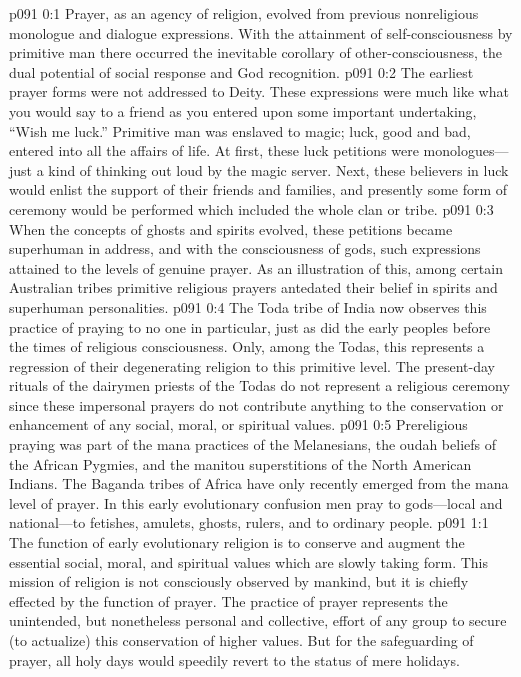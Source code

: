 \author{Chief of Midwayers}
\vs p091 0:1 Prayer, as an agency of religion, evolved from previous nonreligious monologue and dialogue expressions. With the attainment of self\hyp{}consciousness by primitive man there occurred the inevitable corollary of other\hyp{}consciousness, the dual potential of social response and God recognition.
\vs p091 0:2 The earliest prayer forms were not addressed to Deity. These expressions were much like what you would say to a friend as you entered upon some important undertaking, “Wish me luck.” Primitive man was enslaved to magic; luck, good and bad, entered into all the affairs of life. At first, these luck petitions were monologues---just a kind of thinking out loud by the magic server. Next, these believers in luck would enlist the support of their friends and families, and presently some form of ceremony would be performed which included the whole clan or tribe.
\vs p091 0:3 When the concepts of ghosts and spirits evolved, these petitions became superhuman in address, and with the consciousness of gods, such expressions attained to the levels of genuine prayer. As an illustration of this, among certain Australian tribes primitive religious prayers antedated their belief in spirits and superhuman personalities.
\vs p091 0:4 The Toda tribe of India now observes this practice of praying to no one in particular, just as did the early peoples before the times of religious consciousness. Only, among the Todas, this represents a regression of their degenerating religion to this primitive level. The present\hyp{}day rituals of the dairymen priests of the Todas do not represent a religious ceremony since these impersonal prayers do not contribute anything to the conservation or enhancement of any social, moral, or spiritual values.\plusone
\vs p091 0:5 Prereligious praying was part of the mana practices of the Melanesians, the oudah beliefs of the African Pygmies, and the manitou superstitions of the North American Indians. The Baganda tribes of Africa have only recently emerged from the mana level of prayer. In this early evolutionary confusion men pray to gods---local and national---to fetishes, amulets, ghosts, rulers, and to ordinary people.
\vs p091 1:1 The function of early evolutionary religion is to conserve and augment the essential social, moral, and spiritual values which are slowly taking form. This mission of religion is not consciously observed by mankind, but it is chiefly effected by the function of prayer. The practice of prayer represents the unintended, but nonetheless personal and collective, effort of any group to secure (to actualize) this conservation of higher values. But for the safeguarding of prayer, all holy days would speedily revert to the status of mere holidays.\plusone

